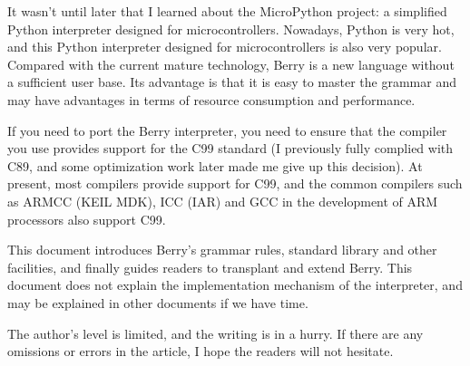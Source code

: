 It wasn't until later that I learned about the MicroPython project: a simplified Python interpreter designed for microcontrollers. Nowadays, Python is very hot, and this Python interpreter designed for microcontrollers is also very popular. Compared with the current mature technology, Berry is a new language without a sufficient user base. Its advantage is that it is easy to master the grammar and may have advantages in terms of resource consumption and performance.

If you need to port the Berry interpreter, you need to ensure that the compiler you use provides support for the C99 standard (I previously fully complied with C89, and some optimization work later made me give up this decision). At present, most compilers provide support for C99, and the common compilers such as ARMCC (KEIL MDK), ICC (IAR) and GCC in the development of ARM processors also support C99.

This document introduces Berry's grammar rules, standard library and other facilities, and finally guides readers to transplant and extend Berry. This document does not explain the implementation mechanism of the interpreter, and may be explained in other documents if we have time.

The author's level is limited, and the writing is in a hurry. If there are any omissions or errors in the article, I hope the readers will not hesitate.


